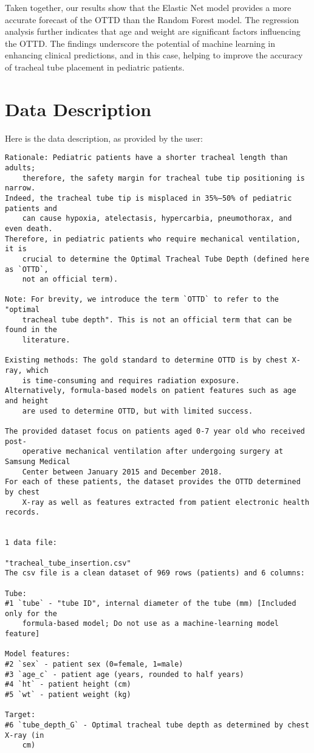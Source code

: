 \documentclass[11pt]{article}
\begin{document}
Taken together, our results show that the Elastic Net model provides a more accurate forecast of the OTTD than the Random Forest model. The regression analysis further indicates that age and weight are significant factors influencing the OTTD. The findings underscore the potential of machine learning in enhancing clinical predictions, and in this case, helping to improve the accuracy of tracheal tube placement in pediatric patients.


\clearpage
\appendix

\section{Data Description} \label{sec:data_description} Here is the data description, as provided by the user:

\begin{Verbatim}[tabsize=4]
Rationale: Pediatric patients have a shorter tracheal length than adults;
	therefore, the safety margin for tracheal tube tip positioning is narrow.
Indeed, the tracheal tube tip is misplaced in 35%–50% of pediatric patients and
	can cause hypoxia, atelectasis, hypercarbia, pneumothorax, and even death.
Therefore, in pediatric patients who require mechanical ventilation, it is
	crucial to determine the Optimal Tracheal Tube Depth (defined here as `OTTD`,
	not an official term).

Note: For brevity, we introduce the term `OTTD` to refer to the "optimal
	tracheal tube depth". This is not an official term that can be found in the
	literature.

Existing methods: The gold standard to determine OTTD is by chest X-ray, which
	is time-consuming and requires radiation exposure.
Alternatively, formula-based models on patient features such as age and height
	are used to determine OTTD, but with limited success.

The provided dataset focus on patients aged 0-7 year old who received post-
	operative mechanical ventilation after undergoing surgery at Samsung Medical
	Center between January 2015 and December 2018.
For each of these patients, the dataset provides the OTTD determined by chest
	X-ray as well as features extracted from patient electronic health records.


1 data file:

"tracheal_tube_insertion.csv"
The csv file is a clean dataset of 969 rows (patients) and 6 columns:

Tube:
#1 `tube` - "tube ID", internal diameter of the tube (mm) [Included only for the
	formula-based model; Do not use as a machine-learning model feature]

Model features:
#2 `sex` - patient sex (0=female, 1=male)
#3 `age_c` - patient age (years, rounded to half years)
#4 `ht` - patient height (cm)
#5 `wt` - patient weight (kg)

Target:
#6 `tube_depth_G` - Optimal tracheal tube depth as determined by chest X-ray (in
	cm)



\end{Verbatim}
\end{document}
